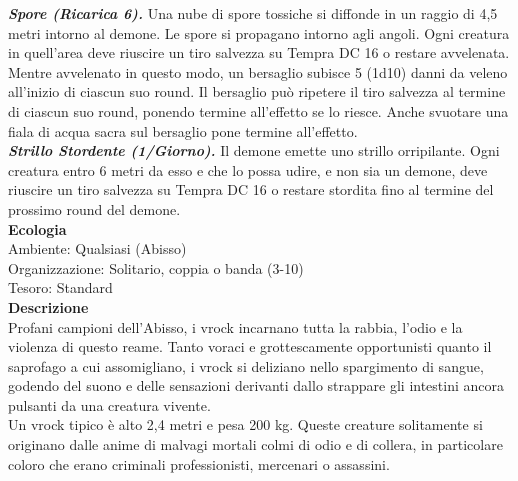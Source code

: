 \begin{multicols}{2}
\emph{\textbf{Spore (Ricarica 6).}} Una nube di spore tossiche si diffonde in un raggio di 4,5 metri intorno al demone. Le spore si propagano intorno agli angoli. Ogni creatura in quell'area deve riuscire un tiro salvezza su Tempra DC  16 o restare avvelenata. Mentre  avvelenato in questo modo, un bersaglio subisce 5 (1d10) danni da veleno all'inizio di ciascun suo round. Il bersaglio può ripetere il tiro salvezza al termine di ciascun suo round, ponendo termine all'effetto se lo riesce. Anche svuotare una fiala di acqua sacra sul bersaglio pone termine all'effetto.\\
\emph{\textbf{Strillo Stordente (1/Giorno).}} Il demone emette uno strillo orripilante. Ogni creatura entro 6 metri da esso e che lo possa udire, e non sia un demone, deve riuscire un tiro salvezza su Tempra DC  16 o restare stordita fino al termine del prossimo round del demone.\\
\textbf{Ecologia}\\
Ambiente: Qualsiasi (Abisso)\\
Organizzazione: Solitario, coppia o banda (3-10)\\
Tesoro: Standard\\
\textbf{Descrizione}\\
Profani campioni dell'Abisso, i vrock incarnano tutta la rabbia, l'odio e la violenza di questo reame. Tanto voraci e grottescamente opportunisti quanto il saprofago a cui assomigliano, i vrock si deliziano nello spargimento di sangue, godendo del suono e delle sensazioni derivanti dallo strappare gli intestini ancora pulsanti da una creatura vivente.\\
Un vrock tipico è alto 2,4 metri e pesa 200 kg. Queste creature solitamente si originano dalle anime di malvagi mortali colmi di odio e di collera, in particolare coloro che erano criminali professionisti, mercenari o assassini.\\


\end{multicols}

